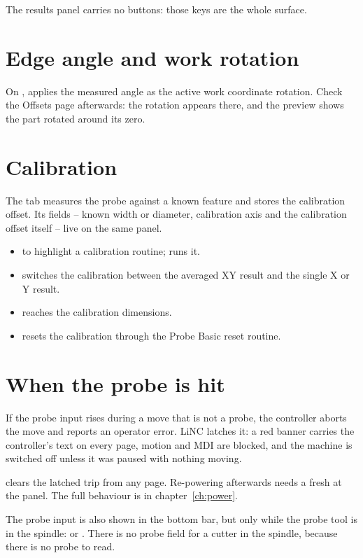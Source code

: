 The results panel carries no buttons: those keys are the whole surface.

\section{Edge angle and work rotation}

On ,  applies the measured angle as the active work coordinate
rotation. Check the Offsets page afterwards: the rotation appears there, and the preview shows
the part rotated around its zero.

\section{Calibration}

The  tab measures the probe against a known feature and stores the calibration
offset. Its fields -- known width or diameter, calibration axis and the calibration offset
itself -- live on the same panel.

\begin{itemize}
  \item {} to  highlight a calibration routine;  runs it.
  \item {} switches the calibration between the averaged XY result and the single X or
        Y result.
  \item {} reaches the calibration dimensions.
  \item {} resets the calibration through the Probe Basic reset routine.
\end{itemize}

\section{When the probe is hit}

If the probe input rises during a move that is not a probe, the controller aborts the move and
reports an operator error. LiNC latches it: a red banner carries the controller's text on every
page, motion and MDI are blocked, and the machine is switched off unless it was paused with
nothing moving.

 clears the latched trip from any page. Re-powering afterwards needs a fresh
 at the panel. The full behaviour is in chapter~\ref{ch:power}.

\begin{notebox}
  The probe input is also shown in the bottom bar, but only while the probe tool is in the
  spindle:  or . There is no probe field for a cutter in
  the spindle, because there is no probe to read.
\end{notebox}
